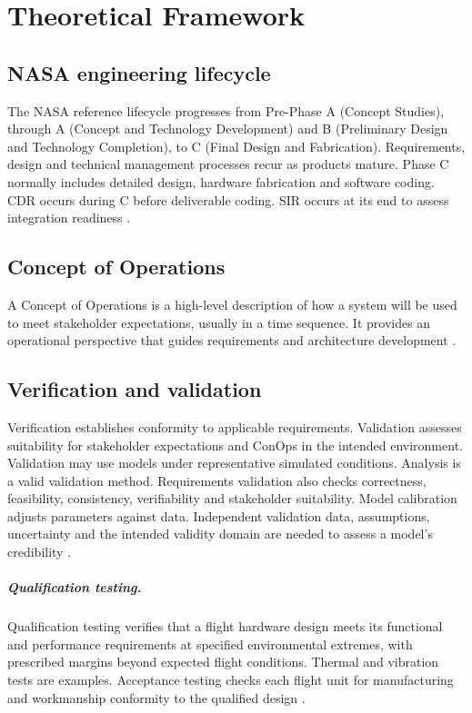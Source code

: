 \chapter{Theoretical Framework}
\label{ch:marco}

\section{NASA engineering lifecycle}
The NASA reference lifecycle progresses from Pre-Phase A (Concept Studies), through A (Concept and Technology Development) and B (Preliminary Design and Technology Completion), to C (Final Design and Fabrication). Requirements, design and technical management processes recur as products mature. Phase C normally includes detailed design, hardware fabrication and software coding. CDR occurs during C before deliverable coding. SIR occurs at its end to assess integration readiness \citep[Secs.~2.2--2.3, 3.3--3.6 and Table~6.7-1]{nasa2016systems}.

\section{Concept of Operations}
A Concept of Operations is a high-level description of how a system will be used to meet stakeholder expectations, usually in a time sequence. It provides an operational perspective that guides requirements and architecture development \citep[Sec.~4.1.1.2.4 and Appendix~B]{nasa2016systems}.

\section{Verification and validation}
Verification establishes conformity to applicable requirements. Validation assesses suitability for stakeholder expectations and ConOps in the intended environment. Validation may use models under representative simulated conditions. Analysis is a valid validation method. Requirements validation also checks correctness, feasibility, consistency, verifiability and stakeholder suitability. Model calibration adjusts parameters against data. Independent validation data, assumptions, uncertainty and the intended validity domain are needed to assess a model's credibility \citep[Secs.~2.4, 4.2 and~5.3--5.4]{nasa2016systems}\citep[pp.~7--9]{handpicked-0001}.

\paragraph{Qualification testing.}
Qualification testing verifies that a flight hardware design meets its functional and performance requirements at specified environmental extremes, with prescribed margins beyond expected flight conditions.
Thermal and vibration tests are examples.
Acceptance testing checks each flight unit for manufacturing and workmanship conformity to the qualified design \citep[Sec.~5.3 and App.~I, Sec.~4.2.4.1]{nasa2016systems}.

